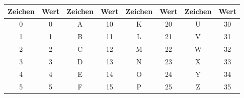 \begin{appendix}
	\begin{table}[htbp]
		\centering
		\begin{tabular}{cccccccc}
			\hline
			\multicolumn{1}{|c|}{\textbf{Zeichen}} & \multicolumn{1}{c|}{\textbf{Wert}} & \multicolumn{1}{c|}{\textbf{Zeichen}} & \multicolumn{1}{c|}{\textbf{Wert}} & \multicolumn{1}{c|}{\textbf{Zeichen}} & \multicolumn{1}{c|}{\textbf{Wert}} & \multicolumn{1}{c|}{\textbf{Zeichen}} & \multicolumn{1}{c|}{\textbf{Wert}} \\ \hline
			\multicolumn{1}{|c|}{0}                & \multicolumn{1}{c|}{0}             & \multicolumn{1}{c|}{A}                & \multicolumn{1}{c|}{10}            & \multicolumn{1}{c|}{K}                & \multicolumn{1}{c|}{20}            & \multicolumn{1}{c|}{U}                & \multicolumn{1}{c|}{30}            \\ \hline
			\multicolumn{1}{|c|}{1}                & \multicolumn{1}{c|}{1}             & \multicolumn{1}{c|}{B}                & \multicolumn{1}{c|}{11}            & \multicolumn{1}{c|}{L}                & \multicolumn{1}{c|}{21}            & \multicolumn{1}{c|}{V}                & \multicolumn{1}{c|}{31}            \\ \hline
			\multicolumn{1}{|c|}{2}                & \multicolumn{1}{c|}{2}             & \multicolumn{1}{c|}{C}                & \multicolumn{1}{c|}{12}            & \multicolumn{1}{c|}{M}                & \multicolumn{1}{c|}{22}            & \multicolumn{1}{c|}{W}                & \multicolumn{1}{c|}{32}            \\ \hline
			\multicolumn{1}{|c|}{3}                & \multicolumn{1}{c|}{3}             & \multicolumn{1}{c|}{D}                & \multicolumn{1}{c|}{13}            & \multicolumn{1}{c|}{N}                & \multicolumn{1}{c|}{23}            & \multicolumn{1}{c|}{X}                & \multicolumn{1}{c|}{33}            \\ \hline
			\multicolumn{1}{|c|}{4}                & \multicolumn{1}{c|}{4}             & \multicolumn{1}{c|}{E}                & \multicolumn{1}{c|}{14}            & \multicolumn{1}{c|}{O}                & \multicolumn{1}{c|}{24}            & \multicolumn{1}{c|}{Y}                & \multicolumn{1}{c|}{34}            \\ \hline
			\multicolumn{1}{|c|}{5}                & \multicolumn{1}{c|}{5}             & \multicolumn{1}{c|}{F}                & \multicolumn{1}{c|}{15}            & \multicolumn{1}{c|}{P}                & \multicolumn{1}{c|}{25}            & \multicolumn{1}{c|}{Z}                & \multicolumn{1}{c|}{35}            \\ \hline

\end{tabular}
\end{table}
\end{appendix}
